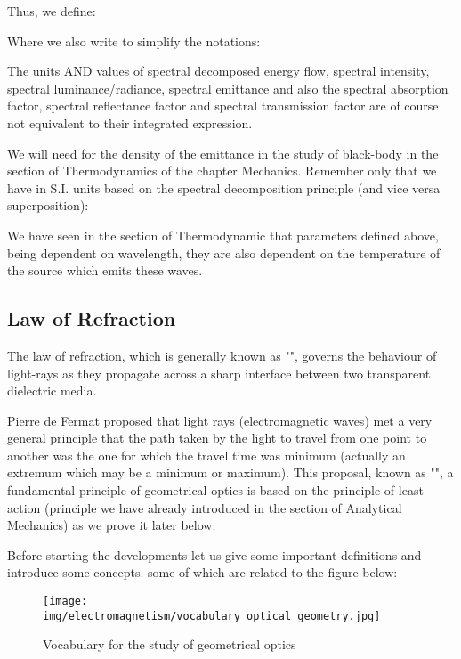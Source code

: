 	Thus, we define:
	
	Where we also write to simplify the notations:
	 
	\begin{tcolorbox}[title=Remark,colframe=black,arc=10pt]
	The units AND values of spectral decomposed energy flow, spectral intensity, spectral luminance/radiance, spectral emittance and also the spectral absorption factor, spectral reflectance factor and spectral transmission factor are of course not equivalent to their integrated expression.
	\end{tcolorbox}
	We will need for the density of the emittance in the study of black-body in the section of Thermodynamics of the chapter Mechanics. Remember only that we have in S.I. units based on the spectral decomposition principle (and vice versa superposition):
	
	\begin{tcolorbox}[title=Remark,colframe=black,arc=10pt]
	 We have seen in the section of Thermodynamic that parameters defined above, being dependent on wavelength, they are also dependent on the temperature of the source which emits these waves.
	\end{tcolorbox}
	
	\subsection{Law of Refraction}
	The law of refraction, which is generally known as "", governs the behaviour of light-rays as they propagate across a sharp interface between two transparent dielectric media.

	Pierre de Fermat proposed that light rays (electromagnetic waves) met a very general principle that the path taken by the light to travel from one point to another was the one for which the travel time was minimum (actually an extremum which may be a minimum or maximum). This proposal, known as "", a fundamental principle of geometrical optics is based on the principle of least action (principle we have already introduced in the section of Analytical Mechanics) as we prove it later below.

	Before starting the developments let us give some important definitions and introduce some concepts. some of which are related to the figure below:
	\begin{figure}[H]
		\centering
		\texttt{[image: img/electromagnetism/vocabulary\_optical\_geometry.jpg]}
		\caption{Vocabulary for the study of geometrical optics}
	\end{figure}
	
